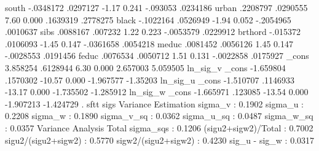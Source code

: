          south {\VBAR}  -.0348172   .0297127    -1.17   0.241     -.093053    .0234186
         urban {\VBAR}   .2208797   .0290555     7.60   0.000     .1639319    .2778275
         black {\VBAR}  -.1022164   .0526949    -1.94   0.052    -.2054965    .0010637
          sibs {\VBAR}   .0088167    .007232     1.22   0.223    -.0053579    .0229912
       brthord {\VBAR}   -.015372   .0106093    -1.45   0.147    -.0361658    .0054218
         meduc {\VBAR}   .0081452   .0056126     1.45   0.147    -.0028553    .0191456
         feduc {\VBAR}   .0076534   .0050712     1.51   0.131    -.0022858    .0175927
         _cons {\VBAR}   3.858254   .6128944     6.30   0.000     2.657003    5.059505
ln_sig_v       {\VBAR}
         _cons {\VBAR}  -1.659804   .1570302   -10.57   0.000    -1.967577    -1.35203
ln_sig_u       {\VBAR}
         _cons {\VBAR}  -1.510707   .1146933   -13.17   0.000    -1.735502   -1.285912
ln_sig_w       {\VBAR}
         _cons {\VBAR}  -1.665971    .123085   -13.54   0.000    -1.907213   -1.424729
{\smallskip}
. sftt sigs
{\smallskip}
               Variance Estimation          
sigma_v    :       0.1902
sigma_u    :       0.2208
sigma_w    :       0.1890
sigma_v_sq :       0.0362
sigma_u_sq :       0.0487
sigma_w_sq :       0.0357
               Variance Analysis          
Total sigma_sqs     :  0.1206
(sigu2+sigw2)/Total :  0.7002
sigu2/(sigu2+sigw2) :  0.5770
sigw2/(sigu2+sigw2) :  0.4230
sig_u - sig_w       :  0.0317
